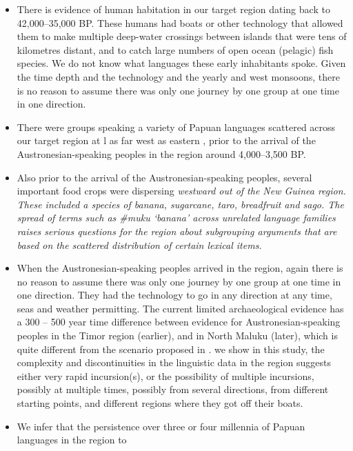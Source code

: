 \begin{itemize}
	\item There is evidence of human habitation in our target region dating back to 42,000--35,000 BP.
				These humans had boats or other technology that allowed them
				to make multiple deep-water crossings between
				islands that were tens of kilometres distant,
				and to catch large numbers of open ocean (pelagic) fish species.
				We do not know what languages these early inhabitants spoke.
				Given the time depth
				and the technology and the yearly 
				and west monsoons, there is no reason to assume there was only one journey by one group at one time in one direction.
	\item There were groups speaking a variety of Papuan languages scattered across our target region
				at l as far west as eastern ,
				prior to the arrival of the Austronesian-speaking peoples in the region around 4,000--3,500 BP.
	\item Also prior to the arrival of the Austronesian-speaking peoples,
				several important food crops were dispersing \it{westward} out of the New Guinea region.
				These included a species of banana,
				sugarcane, taro, breadfruit and sago.
				The spread of terms such as {\#}muku ‘banana’ across unrelated language families raises serious questions
				for the region about subgrouping arguments that are based on the scattered distribution of certain lexical items.
	\item When the Austronesian-speaking peoples arrived in the region,
				again there is no reason to assume there was only one journey by one group at one time in one direction.
				They had the technology to go in any direction at any time,
				seas and weather permitting.
				The current limited archaeological evidence has a 300 -- 500 year time difference between evidence for
				Austronesian-speaking peoples in the Timor region (earlier),
				and in North Maluku (later),
				which is quite different from the scenario proposed in \citet[98]{Blust1993,Blust2008}.
				 we show in this study,
				the complexity and discontinuities in the linguistic data
				in the region suggests either very rapid incursion(s),
				or the possibility of multiple incursions,
				possibly at multiple times,
				possibly from several directions,
				from different starting points,
				and different regions where they got off their boats.
	\item We infer that the persistence over three or four millennia of Papuan languages in the region to

\end{itemize}

